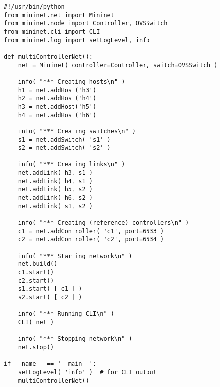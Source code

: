 \begin{lstlisting}[label=lst:task-1-complete-script, caption=Task 1 complete python script]
#!/usr/bin/python
from mininet.net import Mininet
from mininet.node import Controller, OVSSwitch
from mininet.cli import CLI
from mininet.log import setLogLevel, info

def multiControllerNet():
    net = Mininet( controller=Controller, switch=OVSSwitch )

    info( "*** Creating hosts\n" )
    h1 = net.addHost('h3')
    h2 = net.addHost('h4')
    h3 = net.addHost('h5')
    h4 = net.addHost('h6')

    info( "*** Creating switches\n" )
    s1 = net.addSwitch( 's1' )
    s2 = net.addSwitch( 's2' )

    info( "*** Creating links\n" )
    net.addLink( h3, s1 )
    net.addLink( h4, s1 )
    net.addLink( h5, s2 )
    net.addLink( h6, s2 )
    net.addLink( s1, s2 )

    info( "*** Creating (reference) controllers\n" )
    c1 = net.addController( 'c1', port=6633 )
    c2 = net.addController( 'c2', port=6634 )

    info( "*** Starting network\n" )
    net.build()
    c1.start()
    c2.start()
    s1.start( [ c1 ] )
    s2.start( [ c2 ] )

    info( "*** Running CLI\n" )
    CLI( net )

    info( "*** Stopping network\n" )
    net.stop()

if __name__ == '__main__':
    setLogLevel( 'info' )  # for CLI output
    multiControllerNet()
\end{lstlisting}
